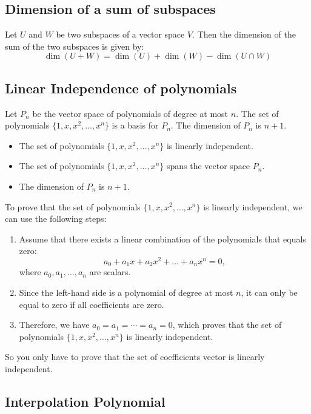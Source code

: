 \QED

\subsection{Dimension of a sum of subspaces}

Let \(U\) and \(W\) be two subspaces of a vector space \(V\). Then the dimension of the sum of the two subspaces is given by:
\[
    \dim(U + W) = \dim(U) + \dim(W) - \dim(U \cap W)    
\]

\subsection{Linear Independence of polynomials}

Let \(P_n\) be the vector space of polynomials of degree at most \(n\). The set of polynomials \(\{1, x, x^2, \ldots, x^n\}\) is a basis for \(P_n\).
The dimension of \(P_n\) is \(n + 1\).

\begin{itemize}[label=\(-\)]
    \item The set of polynomials \(\{1, x, x^2, \ldots, x^n\}\) is linearly independent.
    \item The set of polynomials \(\{1, x, x^2, \ldots, x^n\}\) spans the vector space \(P_n\).
    \item The dimension of \(P_n\) is \(n + 1\).
\end{itemize}

To prove that the set of polynomials \(\{1, x, x^2, \ldots, x^n\}\) is linearly independent, 
we can use the following steps:

\begin{enumerate}
	\item Assume that there exists a linear combination of the polynomials that equals zero:   
	\[
    a_0 + a_1 x + a_2 x^2 + \ldots + a_n x^n = 0,
    \]
    where \(a_0, a_1, \ldots, a_n\) are scalars.
	\item Since the left-hand side is a polynomial of degree at most \(n\), it can only be equal to zero if all coefficients are zero.
    \item Therefore, we have \(a_0 = a_1 = \cdots = a_n = 0\), which 
		  proves that the set of polynomials \(\{1, x, x^2, \ldots, x^n\}\) is linearly independent.
\end{enumerate}

So you only have to prove that the set of coefficients vector is linearly independent.

\subsection{Interpolation Polynomial}

